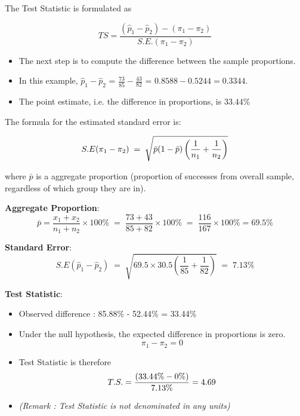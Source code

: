 \documentclass[a4paper,12pt]{article}
\begin{document}
The Test Statistic is formulated as

\[ TS = \frac{(\hat{p}_1-\hat{p}_2)-(\pi_1 - \pi_2)}{S.E.(\pi_1 - \pi_2)}\]




\begin{itemize}
\item The next step is to compute the difference between the sample proportions.
\item In this example, $\hat{p}_1 - \hat{p}_2$ = $\frac{73}{85} - \frac{43}{82}$ = $0.8588 - 0.5244 = 0.3344.$
\item The point estimate, i.e. the difference in proportions, is $33.44\%$
\end{itemize}


\noindent The formula for the estimated standard error is:

\[ S.E (\pi_1 - \pi_2)  \;=\; \sqrt{\bar{p}(1 - \bar{p}) \left( {1 \over n_1} + {1 \over n_2}  \right)} \]


\noindent where $\bar{p}$ is a aggregate proportion (proportion of successes from overall sample, regardless of which group they are in).


\begin{framed}
\noindent \textbf{Aggregate Proportion}:\\
\[ \bar{p}  = \frac{x_1  + x_2 }{ n_1 + n_2} \times 100\% \;=\; \frac{73+43 }{85 + 82} \times 100\% \;=\; \frac{ 116 }{ 167}\times 100\% = 69.5\% \]
\end{framed}
\textbf{Standard Error}:\\
\[ S.E (\hat{p}_1 - \hat{p}_2)  \;=\;  \sqrt{69.5 \times 30.5 \left( \frac{1}{ 85} + \frac{1}{ 82}  \right)}  \;=\; 7.13\% \]



\textbf{Test Statistic}:
\begin{itemize} \item Observed difference :
85.88\% - 52.44\%  = 33.44\% 
\item Under the null hypothesis, the expected difference in proportions is zero.
\[ \pi_1 - \pi_2 = 0\]
\item Test Statistic is therefore \[T.S. = {(33.44\% - 0\% )\over 7.13\%} = 4.69\]
\item \textit{(Remark : Test Statistic is not denominated in any units)}
\end{itemize}

\end{document}
